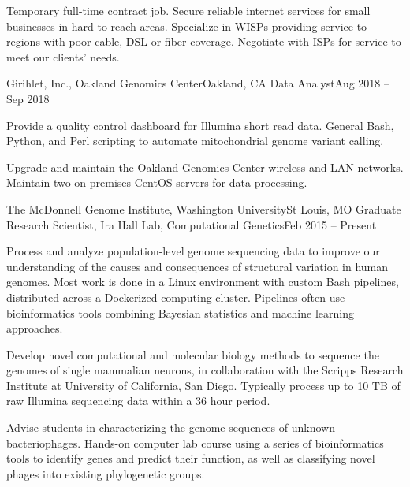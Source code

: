 	    \resumeItemListStart
	    
		{Temporary full-time contract job. Secure reliable internet services for small businesses in hard-to-reach areas. Specialize in WISPs providing service to regions with poor cable, DSL or fiber coverage. Negotiate with ISPs for service to meet our clients' needs.}
		
	\resumeItemListEnd
	
	    \resumeSubheading
	    {Girihlet, Inc., Oakland Genomics Center}{Oakland, CA}
	    {Data Analyst}{Aug 2018 -- Sep 2018}
	    
	    \resumeItemListStart
	    
	    	{Provide a quality control dashboard for Illumina short read data. General Bash, Python, and Perl scripting to automate mitochondrial genome variant calling.}
	    		
	    	{Upgrade and maintain the Oakland Genomics Center wireless and LAN networks. Maintain two on-premises CentOS servers for data processing.}
		
	\resumeItemListEnd
     
        \resumeSubheading
        {The McDonnell Genome Institute, Washington University}{St Louis, MO}
        {Graduate Research Scientist, Ira Hall Lab, Computational Genetics}{Feb 2015 -- Present}

        \resumeItemListStart

            {Process and analyze population-level genome sequencing data to improve our understanding of the causes and consequences of structural variation in human genomes. Most work is done in a Linux environment with custom Bash pipelines, distributed across a Dockerized computing cluster. Pipelines often use bioinformatics tools combining Bayesian statistics and machine learning approaches.}
            
            {Develop novel computational and molecular biology methods to sequence the genomes of single mammalian neurons, in collaboration with the Scripps Research Institute at University of California, San Diego. Typically process up to 10 TB of raw Illumina sequencing data within a 36 hour period.}
            
            {Advise students in characterizing the genome sequences of unknown bacteriophages. Hands-on computer lab course using a series of bioinformatics tools to identify genes and predict their function, as well as classifying novel phages into existing phylogenetic groups.}

